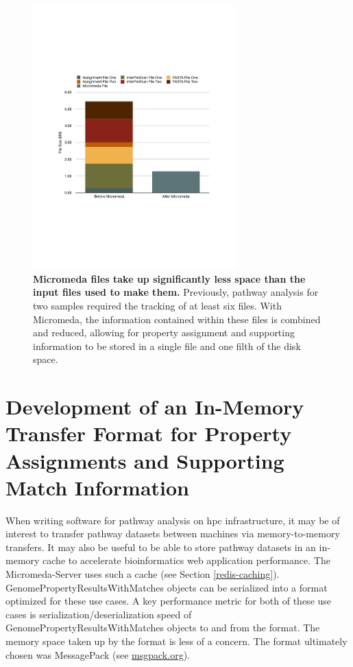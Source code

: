 \begin{figure}[!ht]
  \centering
	\includegraphics[width=0.70\textwidth]{media/micromeda_file_size.pdf}
	 \caption[Micromeda files take up significantly less space than the input files used to make them.]{\textbf{Micromeda files take up significantly less space than the input files used to make them.} Previously, pathway analysis for two samples required the tracking of at least six files. With Micromeda, the information contained within these files is combined and reduced, allowing for property assignment and supporting information to be stored in a single file and one filth of the disk space.}
	 \label{fig:micromedafilesize}
\end{figure}

\section{Development of an In-Memory Transfer Format for Property Assignments and Supporting Match Information} \label{msgpack}

When writing software for pathway analysis on \gls{hpc} infrastructure, it may be of interest to transfer pathway datasets between machines via memory-to-memory transfers. It may also be useful to be able to store pathway datasets in an in-memory cache to accelerate bioinformatics web application performance. The Micromeda-Server uses such a cache (see Section \ref{redis-caching}). GenomePropertyResultsWithMatches objects can be serialized into a format optimized for these use cases. A key performance metric for both of these use cases is serialization/deserialization speed of GenomePropertyResultsWithMatches objects to and from the format. The memory space taken up by the format is less of a concern. The format ultimately chosen was MessagePack  \cite{furuhashi2013messagepack}(see \href{http://msgpack.org}{msgpack.org}).

